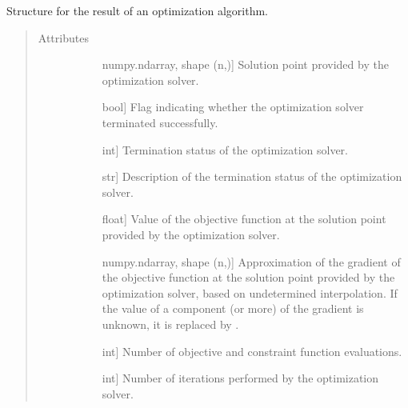 \documentclass[letterpaper,10pt,english]{sphinxmanual}
\begin{document}
\begin{fulllineitems}
\label{\detokenize{refs/generated/cobyqa.OptimizeResult:cobyqa.OptimizeResult}}
\sphinxAtStartPar
Structure for the result of an optimization algorithm.
\begin{quote}\begin{description}
\item[{Attributes}] \leavevmode\begin{description}
\item[{}] \leavevmode{[}numpy.ndarray, shape (n,){]}
\sphinxAtStartPar
Solution point provided by the optimization solver.

\item[{}] \leavevmode{[}bool{]}
\sphinxAtStartPar
Flag indicating whether the optimization solver terminated successfully.

\item[{}] \leavevmode{[}int{]}
\sphinxAtStartPar
Termination status of the optimization solver.

\item[{}] \leavevmode{[}str{]}
\sphinxAtStartPar
Description of the termination status of the optimization solver.

\item[{}] \leavevmode{[}float{]}
\sphinxAtStartPar
Value of the objective function at the solution point provided by the
optimization solver.

\item[{}] \leavevmode{[}numpy.ndarray, shape (n,){]}
\sphinxAtStartPar
Approximation of the gradient of the objective function at the solution
point provided by the optimization solver, based on undetermined
interpolation. If the value of a component (or more) of the gradient is
unknown, it is replaced by .

\item[{}] \leavevmode{[}int{]}
\sphinxAtStartPar
Number of objective and constraint function evaluations.

\item[{}] \leavevmode{[}int{]}
\sphinxAtStartPar
Number of iterations performed by the optimization solver.


\end{description}
\end{description}
\end{quote}
\end{fulllineitems}
\end{document}
